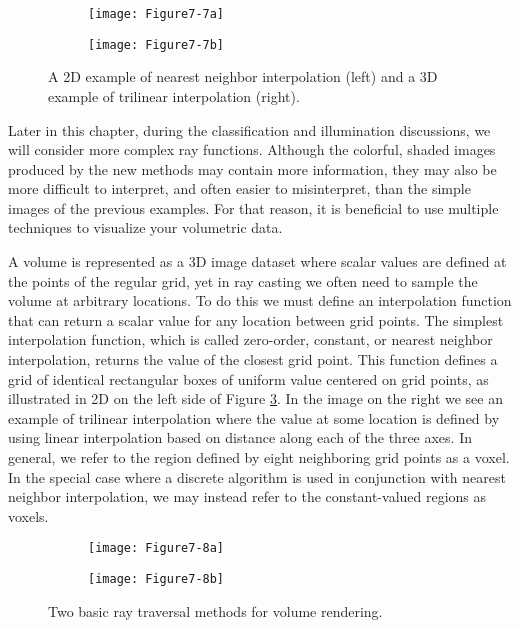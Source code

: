 \begin{figure}[!htb]
	\begin{subfigure}[h]{0.48\linewidth}
		\texttt{[image: Figure7-7a]}
		\caption*{}\label{fig:Figure7-7a}
	\end{subfigure}
	\hfill
	\begin{subfigure}[h]{0.48\linewidth}
		\texttt{[image: Figure7-7b]}
		\caption*{}\label{fig:Figure7-7b}
	\end{subfigure}%
	\caption{A 2D example of nearest neighbor interpolation (left) and a 3D example of trilinear interpolation (right).}\label{fig:Figure7-7}
\end{figure}

Later in this chapter, during the classification and illumination discussions, we will consider more complex ray functions. Although the colorful, shaded images produced by the new methods may contain more information, they may also be more difficult to interpret, and often easier to misinterpret, than the simple images of the previous examples. For that reason, it is beneficial to use multiple techniques to visualize your volumetric data.

A volume is represented as a 3D image dataset where scalar values are defined at the points of the regular grid, yet in ray casting we often need to sample the volume at arbitrary locations. To do this we must define an interpolation function that can return a scalar value for any location between grid points. The simplest interpolation function, which is called zero-order, constant, or nearest neighbor interpolation, returns the value of the closest grid point. This function defines a grid of identical rectangular boxes of uniform value centered on grid points, as illustrated in 2D on the left side of Figure \ref{fig:Figure7-7}. In the image on the right we see an example of trilinear interpolation where the value at some location is defined by using linear interpolation based on distance along each of the three axes. In general, we refer to the region defined by eight neighboring grid points as a voxel. In the special case where a discrete algorithm is used in conjunction with nearest neighbor interpolation, we may instead refer to the constant-valued regions as voxels.

\begin{figure}[!htb]
	\begin{subfigure}[h]{0.48\linewidth}
		\texttt{[image: Figure7-8a]}
		\caption*{}\label{fig:Figure7-8a}
	\end{subfigure}
	\hfill
	\begin{subfigure}[h]{0.48\linewidth}
		\texttt{[image: Figure7-8b]}
		\caption*{}\label{fig:Figure7-8b}
	\end{subfigure}%
	\caption{Two basic ray traversal methods for volume rendering.}\label{fig:Figure7-8}
\end{figure}

